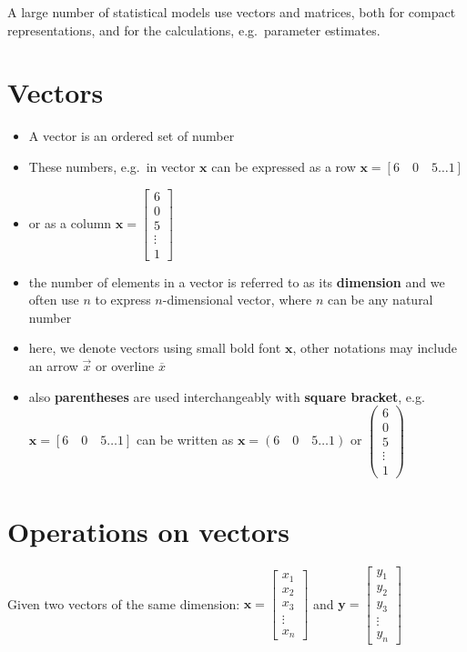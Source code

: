 \documentclass[
]{book}
\providecommand{\tightlist}{%
  \setlength{\itemsep}{0pt}\setlength{\parskip}{0pt}}
\theoremstyle{definition}
\theoremstyle{definition}
\theoremstyle{definition}
\theoremstyle{remark}
\begin{document}
A large number of statistical models use vectors and matrices, both for compact representations, and for the calculations, e.g.~parameter estimates.

\hypertarget{vectors-1}{%
\section{Vectors}\label{vectors-1}}

\begin{itemize}
\tightlist
\item
  A vector is an ordered set of number
\item
  These numbers, e.g.~in vector \(\mathbf{x}\) can be expressed as a row \(\mathbf{x}=[6\quad 0\quad 5 \dots1]\)
\item
  or as a column \(\mathbf{x}=\begin{bmatrix} 6 \\ 0 \\ 5 \\ \vdots \\ 1 \end{bmatrix}\)
\item
  the number of elements in a vector is referred to as its \textbf{dimension} and we often use \(n\) to express \(n\)-dimensional vector, where \(n\) can be any natural number
\item
  here, we denote vectors using small bold font \(\mathbf{x}\), other notations may include an arrow \(\vec x\) or overline \(\overline{x}\)
\item
  also \textbf{parentheses} are used interchangeably with \textbf{square bracket}, e.g.~\(\mathbf{x}=[6\quad 0\quad 5 \dots1]\) can be written as \(\mathbf{x}=(6\quad 0\quad 5 \dots1)\) or \(\begin{pmatrix} 6\\ 0\\ 5\\ \vdots \\ 1 \end{pmatrix}\)
\end{itemize}

\hypertarget{operations-on-vectors}{%
\section{Operations on vectors}\label{operations-on-vectors}}

Given two vectors of the same dimension:
\(\mathbf{x}=\begin{bmatrix}  x_1 \\  x_2 \\  x_3 \\  \vdots \\  x_n \end{bmatrix}\)
and
\(\mathbf{y}=\begin{bmatrix}  y_1 \\  y_2 \\  y_3 \\  \vdots \\  y_n \end{bmatrix}\)
\end{document}
